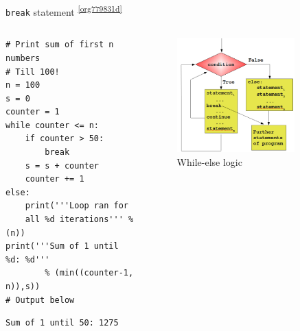 \documentclass[presentation]{beamer}
\begin{document}
\begin{frame}[label={sec:orgfb60a95},fragile]{\texttt{break} statement \textsuperscript{\ref{org779831d}}}
 \begin{columns}
\begin{column}{0.48\columnwidth}
\scriptsize
\begin{verbatim}
# Print sum of first n numbers
# Till 100!
n = 100
s = 0
counter = 1
while counter <= n:
    if counter > 50:
        break
    s = s + counter
    counter += 1
else:
    print('''Loop ran for
    all %d iterations''' % (n))
print('''Sum of 1 until %d: %d'''
        % (min((counter-1, n)),s))
# Output below
\end{verbatim}

\begin{verbatim}
Sum of 1 until 50: 1275
\end{verbatim}
\end{column}


\begin{column}{0.45\columnwidth}
\footnotesize
\begin{figure}[htbp]
\centering
\includegraphics[width=0.8\textwidth]{images/while_loop_with_else_break.png}
\caption{While-else logic}
\end{figure}
\end{column}
\end{columns}
\end{frame}
\end{document}
